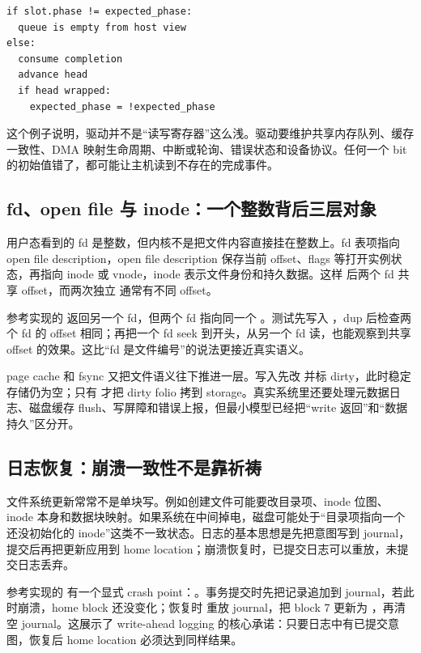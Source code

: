 \begin{lstlisting}
if slot.phase != expected_phase:
  queue is empty from host view
else:
  consume completion
  advance head
  if head wrapped:
    expected_phase = !expected_phase
\end{lstlisting}

这个例子说明，驱动并不是“读写寄存器”这么浅。驱动要维护共享内存队列、缓存一致性、DMA 映射生命周期、中断或轮询、错误状态和设备协议。任何一个 bit 的初始值错了，都可能让主机读到不存在的完成事件。

\subsection{fd、open file 与 inode：一个整数背后三层对象}

用户态看到的 fd 是整数，但内核不是把文件内容直接挂在整数上。fd 表项指向 open file description，open file description 保存当前 offset、flags 等打开实例状态，再指向 inode 或 vnode，inode 表示文件身份和持久数据。这样  后两个 fd 共享 offset，而两次独立  通常有不同 offset。

参考实现的  返回另一个 fd，但两个 fd 指向同一个 。测试先写入 ，dup 后检查两个 fd 的 offset 相同；再把一个 fd seek 到开头，从另一个 fd 读，也能观察到共享 offset 的效果。这比“fd 是文件编号”的说法更接近真实语义。

page cache 和 fsync 又把文件语义往下推进一层。写入先改  并标 dirty，此时稳定存储仍为空；只有  才把 dirty folio 拷到 storage。真实系统里还要处理元数据日志、磁盘缓存 flush、写屏障和错误上报，但最小模型已经把“write 返回”和“数据持久”区分开。

\subsection{日志恢复：崩溃一致性不是靠祈祷}

文件系统更新常常不是单块写。例如创建文件可能要改目录项、inode 位图、inode 本身和数据块映射。如果系统在中间掉电，磁盘可能处于“目录项指向一个还没初始化的 inode”这类不一致状态。日志的基本思想是先把意图写到 journal，提交后再把更新应用到 home location；崩溃恢复时，已提交日志可以重放，未提交日志丢弃。

参考实现的  有一个显式 crash point：。事务提交时先把记录追加到 journal，若此时崩溃，home block 还没变化；恢复时  重放 journal，把 block 7 更新为 ，再清空 journal。这展示了 write-ahead logging 的核心承诺：只要日志中有已提交意图，恢复后 home location 必须达到同样结果。

